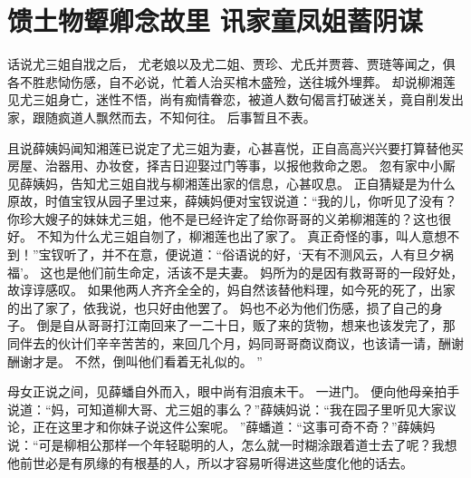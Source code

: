 \chapter[馈土物颦卿念故里 \quad 讯家童凤姐蓄阴谋]{馈土物颦卿念故里 \quad 讯家童凤姐蓄阴谋}
\par
话说尤三姐自戕之后，
尤老娘以及尤二姐、贾珍、尤氏并贾蓉、贾琏等闻之，俱各不胜悲恸伤感，自不必说，忙着人治买棺木盛殓，送往城外埋葬。
却说柳湘莲见尤三姐身亡，迷性不悟，尚有痴情眷恋，被道人数句偈言打破迷关，竟自削发出家，跟随疯道人飘然而去，不知何往。
后事暂且不表。
\par
且说薛姨妈闻知湘莲已说定了尤三姐为妻，心甚喜悦，正自高高兴兴要打算替他买房屋、治器用、办妆奁，择吉日迎娶过门等事，以报他救命之恩。
忽有家中小厮见薛姨妈，告知尤三姐自戕与柳湘莲出家的信息，心甚叹息。
正自猜疑是为什么原故，时值宝钗从园子里过来，薛姨妈便对宝钗说道：“我的儿，你听见了没有？你珍大嫂子的妹妹尤三姐，他不是已经许定了给你哥哥的义弟柳湘莲的？这也很好。
不知为什么尤三姐自刎了，柳湘莲也出了家了。
真正奇怪的事，叫人意想不到！”宝钗听了，并不在意，便说道：“俗语说的好，‘天有不测风云，人有旦夕祸福’。
这也是他们前生命定，活该不是夫妻。
妈所为的是因有救哥哥的一段好处，故谆谆感叹。
如果他两人齐齐全全的，妈自然该替他料理，如今死的死了，出家的出了家了，依我说，也只好由他罢了。
妈也不必为他们伤感，损了自己的身子。
倒是自从哥哥打江南回来了一二十日，贩了来的货物，想来也该发完了，那同伴去的伙计们辛辛苦苦的，来回几个月，妈同哥哥商议商议，也该请一请，酬谢酬谢才是。
不然，倒叫他们看着无礼似的。
”\par
母女正说之间，见薛蟠自外而入，眼中尚有泪痕未干。
一进门。
便向他母亲拍手说道：“妈，可知道柳大哥、尤三姐的事么？”薛姨妈说：“我在园子里听见大家议论，正在这里才和你妹子说这件公案呢。
”薛蟠道：“这事可奇不奇？”薛姨妈说：“可是柳相公那样一个年轻聪明的人，怎么就一时糊涂跟着道士去了呢？我想他前世必是有夙缘的有根基的人，所以才容易听得进这些度化他的话去。
